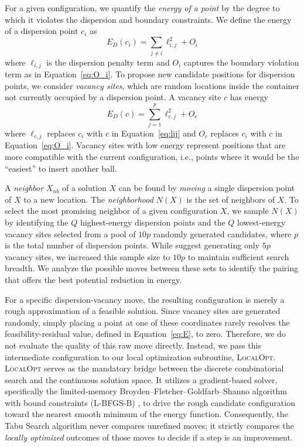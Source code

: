 \documentclass[preprint,12pt]{elsarticle}
\theoremstyle{remark}
\begin{document}
For a given configuration, we quantify the \textit{energy of a point} by the
degree to which it violates the dispersion and boundary constraints. We define
the energy of a dispersion point $c_i$ as
\begin{equation}
  E_D(c_i) = \sum_{j \ne i} \ell_{i, j}^2 + O_i
  \label{eq:dispersion_point_energy}
\end{equation}
where $\ell_{i, j}$ is the dispersion penalty term and $O_i$ captures the
boundary violation term as in Equation~\ref{eq:O_i}. To propose new candidate
positions for dispersion points, we consider \textit{vacancy sites}, which are
random locations inside the container not currently occupied by a dispersion
point. A vacancy site $c$ has energy
\begin{equation}
  E_D(c) = \sum_{j = 1}^p \ell_{c, j}^2 + O_{c}
  \label{eq:vacancy_energy}
\end{equation}
where $\ell_{c, j}$ replaces $c_i$ with $c$ in Equation~\ref{eq:lij} and $O_c$
replaces $c_i$ with $c$ in Equation~\ref{eq:O_i}. Vacancy sites with low energy
represent positions that are more compatible with the current configuration,
i.e., points where it would be the ``easiest'' to insert another ball.

A \textit{neighbor} $X_{nb}$ of a solution $X$ can be found by \textit{moving} a
single dispersion point of $X$ to a new location. The \textit{neighborhood}
$N(X)$ is the set of neighbors of $X$. To select the most promising neighbor of
a given configuration $X$, we sample $N(X)$ by identifying the $Q$
highest-energy dispersion points and the $Q$ lowest-energy vacancy sites
selected from a pool of $10p$ randomly generated candidates, where $p$ is the
total number of dispersion points. While \citet{lai2024} suggest generating only
$5p$ vacancy sites, we increased this sample size to $10p$ to maintain
sufficient search breadth. We analyze the possible moves between these sets to
identify the pairing that offers the best potential reduction in energy.

For a specific dispersion-vacancy move, the resulting configuration is merely a
rough approximation of a feasible solution. Since vacancy sites are generated
randomly, simply placing a point at one of these coordinates rarely resolves the
feasibility-residual value, defined in Equation~\ref{eq:E}, to zero. Therefore,
we do not evaluate the quality of this raw move directly. Instead, we pass this
intermediate configuration to our local optimization subroutine,
\textsc{LocalOpt}. \textsc{LocalOpt} serves as the mandatory bridge between the
discrete combinatorial search and the continuous solution space. It utilizes a
gradient-based solver, specifically the limited-memory
Broyden--Fletcher--Goldfarb--Shanno algorithm with bound constraints (L-BFGS-B)
\citep{fletcher1987, byrd1995}, to drive the rough candidate configuration
toward the nearest smooth minimum of the energy function. Consequently, the Tabu
Search algorithm never compares unrefined moves; it strictly compares the
\textit{locally optimized} outcomes of those moves to decide if a step is an
improvement.
\end{document}
